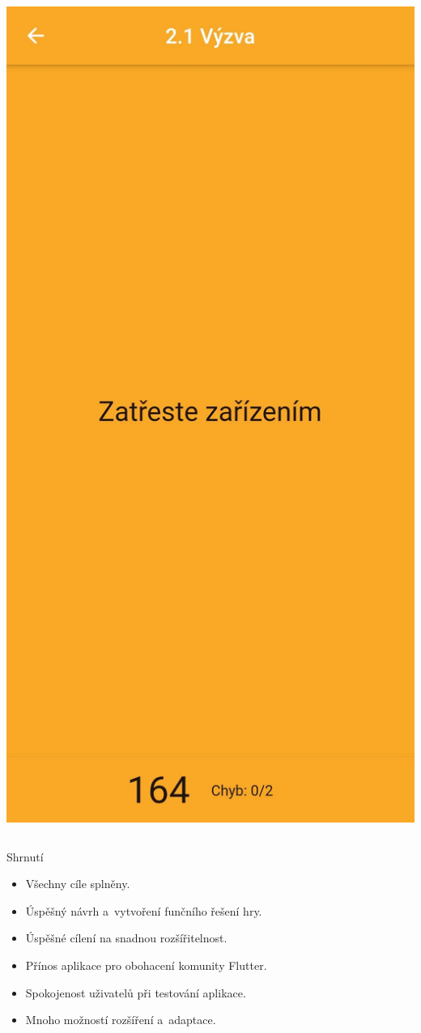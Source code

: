 \documentclass[czech,aspectratio=169]{beamer}
\begin{document}
\begin{frame}
\begin{columns}
\begin{column}{.25\textwidth}
\begin{center}
          \includegraphics[width=.9\textwidth]{assets/slides/screen-b4}
        \end{center}
      \end{column}
    \end{columns}
  \end{frame}

  \begin{frame}{Shrnutí}
    \begin{itemize}
      \item Všechny cíle splněny.
      \item Úspěšný návrh a~vytvoření funčního řešení hry.
      \item Úspěšné cílení na snadnou rozšířitelnost.
      \item Přínos aplikace pro obohacení komunity Flutter.
      \item Spokojenost uživatelů při testování aplikace.
      \item Mnoho možností rozšíření a~adaptace.
    \end{itemize}
  \end{frame}
\end{document}
